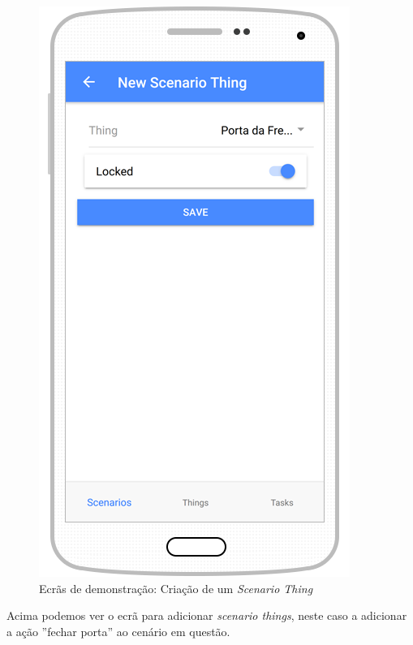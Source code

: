 \begin{figure}[H]
  \centering
        \includegraphics[scale=0.6]{img/demo/new_scenario_thing_lock.png}
  \caption{Ecrãs de demonstração: Criação de um \textit{Scenario Thing}}
\end{figure}

Acima podemos ver o ecrã para adicionar \textit{scenario things}, neste caso a adicionar a ação ''fechar porta'' ao cenário em questão.

